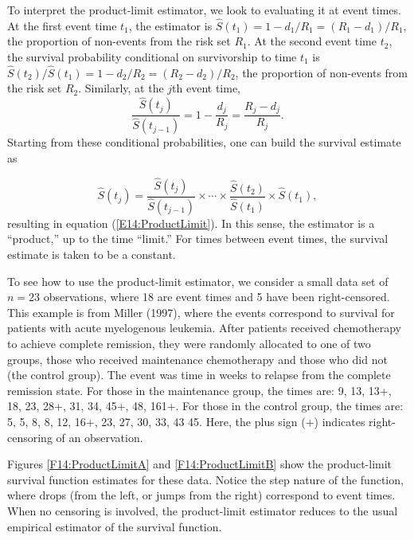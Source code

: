 To interpret the product-limit estimator, we look to evaluating it
at event times. At the first event time $t_1$, the estimator is
$\widehat{S}(t_1)= 1- d_1/R_1=(R_1 - d_1)/R_1$, the proportion of
non-events from the risk set $R_1$. At the second event time $t_2$,
the survival probability conditional on survivorship to time $t_1$
is $\widehat{S}(t_2)/ \widehat{S}(t_1)= 1 - d_2/R_2=(R_2 -
d_2)/R_2$, the proportion of non-events from the risk set $R_2$.
Similarly, at  the $j$th event time,
\begin{equation*}\frac{\widehat{S}(t_j)}{\widehat{S}(t_{j-1})}= 1 - \frac{d_j}{R_j}=\frac{R_j -
d_j}{R_j} .
\end{equation*}
Starting from these conditional probabilities, one can build the
survival estimate as

\begin{equation*}
\widehat{S}(t_j) = \frac{\widehat{S}(t_j)}{\widehat{S}(t_{j-1})}
\times \cdots \times \frac{\widehat{S}(t_2)}{\widehat{S}(t_{1})}
\times \widehat{S}(t_{1}),
\end{equation*}
resulting in equation (\ref{E14:ProductLimit}). In this sense, the
estimator is a ``product,'' up to the time ``limit.'' For times
between event times, the survival estimate is taken to be a
constant.

To see how to use the product-limit estimator, we consider a small
data set of $n=23$ observations, where 18 are event times and 5 have
been right-censored. This example is from Miller (1997), where the
events correspond to survival for patients with acute myelogenous
leukemia. After patients received chemotherapy to achieve complete
remission, they were randomly allocated to one of two groups, those
who received maintenance chemotherapy and those who did not (the
control group). The event was time in weeks to relapse from the
complete remission state. For those in the maintenance group, the
times are: 9, 13, 13+, 18, 23, 28+, 31, 34, 45+, 48, 161+. For those
in the control group, the times are: 5, 5, 8, 8, 12, 16+, 23, 27,
30, 33, 43 45. Here, the plus sign (+) indicates right-censoring of
an observation.

Figures \ref{F14:ProductLimitA} and \ref{F14:ProductLimitB} show the
product-limit survival function estimates for these data. Notice the
step nature of the function, where drops (from the left, or jumps
from the right) correspond to event times. When no censoring is
involved, the product-limit estimator reduces to the usual empirical
estimator of the survival function.


